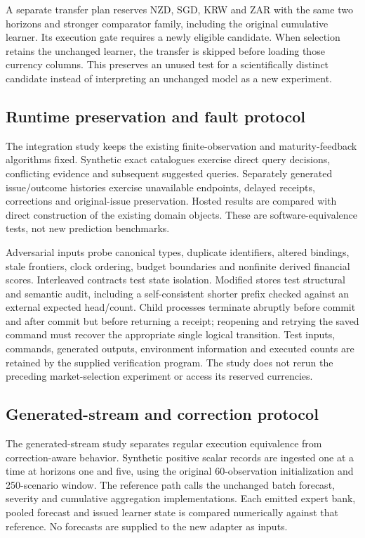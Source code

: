 \documentclass[11pt,a4paper]{article}
\theoremstyle{definition}\newtheorem{definition}[theorem]{Definition}
\begin{document}
A separate transfer plan reserves NZD, SGD, KRW and ZAR with the same two horizons and stronger comparator family, including the original cumulative learner. Its execution gate requires a newly eligible candidate. When selection retains the unchanged learner, the transfer is skipped before loading those currency columns. This preserves an unused test for a scientifically distinct candidate instead of interpreting an unchanged model as a new experiment.

\subsection{Runtime preservation and fault protocol}\label{sec:runtimeprotocol}
The integration study keeps the existing finite-observation and maturity-feedback algorithms fixed. Synthetic exact catalogues exercise direct query decisions, conflicting evidence and subsequent suggested queries. Separately generated issue/outcome histories exercise unavailable endpoints, delayed receipts, corrections and original-issue preservation. Hosted results are compared with direct construction of the existing domain objects. These are software-equivalence tests, not new prediction benchmarks.

Adversarial inputs probe canonical types, duplicate identifiers, altered bindings, stale frontiers, clock ordering, budget boundaries and nonfinite derived financial scores. Interleaved contracts test state isolation. Modified stores test structural and semantic audit, including a self-consistent shorter prefix checked against an external expected head/count. Child processes terminate abruptly before commit and after commit but before returning a receipt; reopening and retrying the saved command must recover the appropriate single logical transition. Test inputs, commands, generated outputs, environment information and executed counts are retained by the supplied verification program. The study does not rerun the preceding market-selection experiment or access its reserved currencies.

\subsection{Generated-stream and correction protocol}\label{sec:streamprotocol}
The generated-stream study separates regular execution equivalence from correction-aware behavior. Synthetic positive scalar records are ingested one at a time at horizons one and five, using the original 60-observation initialization and 250-scenario window. The reference path calls the unchanged batch forecast, severity and cumulative aggregation implementations. Each emitted expert bank, pooled forecast and issued learner state is compared numerically against that reference. No forecasts are supplied to the new adapter as inputs.
\end{document}
